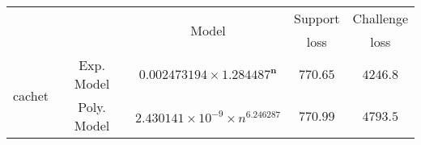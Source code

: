 \begin{tabular}{ccccc} 
\hline 
 &  & \multirow{2}{*}{Model} & Support & Challenge\tabularnewline 
 &  &  & loss  & loss\tabularnewline 
\hline 
\hline 
\multirow{2}{*}{cachet} & Exp. Model & $\mathbf{0.002473194\times 1.284487^{n}}$ & $\mathbf{770.65}$ & $\mathbf{4246.8}$ \tabularnewline 
 & Poly. Model & $2.430141\times10^{-9}\times n^{6.246287}$ & $770.99$ & $4793.5$ \tabularnewline 
\hline 
\end{tabular} 

